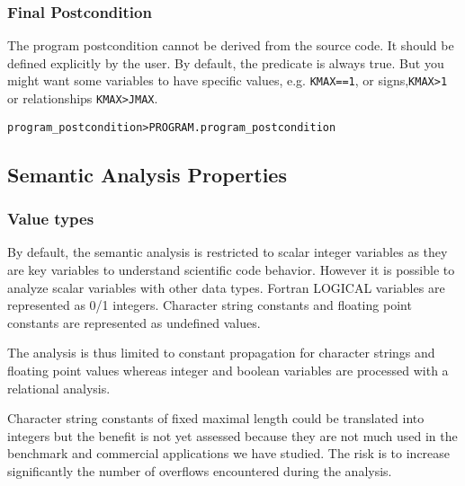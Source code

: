 \documentclass[a4paper]{report}
\newenvironment{PipsMake}{\begin{alltt}}{\end{alltt}}
\begin{document}
\subsubsection{Final Postcondition}
\label{subsubsection-final-postcondition}

The program postcondition cannot be derived from the source code. It
should be defined explicitly by the user. By default, the predicate is
always true. But you might want some variables to have specific values,
e.g. \verb+KMAX==1+, or signs,\verb+KMAX>1+ or relationships
\verb+KMAX>JMAX+.

\begin{PipsMake}
program_postcondition     > PROGRAM.program_postcondition
\end{PipsMake}

\subsection{Semantic Analysis Properties}
\label{subsection-semantic-analysis}

\subsubsection{Value types}

By default, the semantic analysis is restricted to scalar integer
variables as they are key variables to understand scientific code
behavior. However it is possible to analyze scalar variables with other
data types. Fortran LOGICAL variables are represented as 0/1
integers. Character string constants and floating point constants are
represented as undefined values.

The analysis is thus limited to constant propagation for character strings
and floating point values whereas integer and boolean variables are
processed with a relational analysis.

Character string constants of fixed maximal length could be translated
into integers but the benefit is not yet assessed because they are not
much used in the benchmark and commercial applications we have studied.
The risk is to increase significantly the number of overflows encountered
during the analysis.
\end{document}
